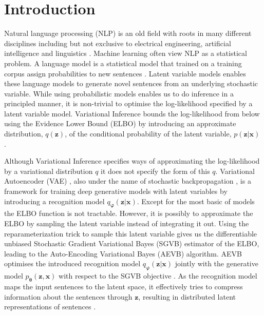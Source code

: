 \chapter{Introduction}
\label{IntroductionCh}



Natural language processing (NLP) is an old field with roots in many different
disciplines including but not exclusive to electrical engineering, artificial
intelligence and linguistics \cite[p.~10-15]{Jurafsky:2000:SLP:555733}. Machine
learning often view NLP as a statistical problem. A
language model is a statistical model that trained on a training corpus assign
probabilities to new sentences \cite{Bengio:2003:NPL:944919.944966}. Latent variable models enables these
language models to generate novel sentences from an underlying stochastic
variable. While using probabilistic models enables us to do inference in a
principled manner, it is non-trivial to optimise the log-likelihood
specified by a latent variable model. Variational Inference bounds the log-likelihood
from below using the Evidence Lower Bound (ELBO) by
introducing an approximate distribution, $q(\bm{z})$, of the conditional probability of the
latent variable, $p(\bm{z} | \bm{x})$ \cite{blei_variational_2017}.


Although Variational Inference specifies ways of approximating the
log-likelihood by a variational distribution $q$ it does not specify the form of
this $q$. Variational Autoencoder (VAE) \cite{kingma_auto-encoding_2013}, also
under the name of stochastic backpropagation \cite{2014arXiv1401.4082J}, is a
framework for training deep generative models with latent variables by
introducing a recognition model $q_{\bm{\varphi}}(\bm{z} | \bm{x})$. Except for the most basic of
models the ELBO function is not tractable. However, it is possibly to
approximate the ELBO by sampling the latent variable instead of
integrating it out. Using the reparameterization trick to sample this latent
variable gives us the differentiable unbiased Stochastic Gradient Variational
Bayes (SGVB) estimator of the ELBO, leading to the Auto-Encoding Variational
Bayes (AEVB) algorithm. AEVB optimises the introduced recognition model
$q_{\bm{\varphi}}(\bm{z} | \bm{x})$ jointly with the generative model
$p_{\bm{\theta}}(\bm{z}, \bm{x})$ with respect to the SGVB objective
\cite{kingma_auto-encoding_2013}. As the recognition model maps the input sentences to the latent space, it effectively tries to compress
information about the sentences through $\bm{z}$, resulting in distributed
latent representations of sentences \cite{bowman_generating_2015}.

